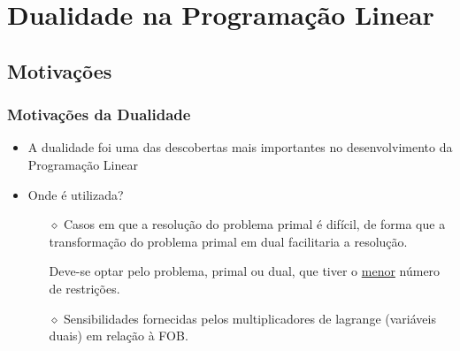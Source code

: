 \documentclass{beamer}
\begin{document}
\section{Dualidade na Programação Linear}
\subsection{Motivações}

\begin{frame}
	\frametitle{Motivações da Dualidade}
	\begin{itemize}
	\item {A dualidade foi uma das descobertas mais importantes no desenvolvimento da Programação Linear} \pause
	\item {Onde é utilizada?} \pause
		\begin{itemize} 
		\item[$\diamond$] {Casos em que a resolução do problema primal é difícil, de forma que a transformação do problema primal em dual facilitaria a resolução.} \pause 
			\begin{mdframed}[backgroundcolor=black!30]
				Deve-se optar pelo problema, primal ou dual, que tiver o \underline{\color{red}menor} número de restrições.
			\end{mdframed} \pause
		\item[$\diamond$] Sensibilidades fornecidas pelos multiplicadores de lagrange (variáveis duais) em relação à FOB.
		\end{itemize}
	\end{itemize}
\end{frame}
\end{document}
